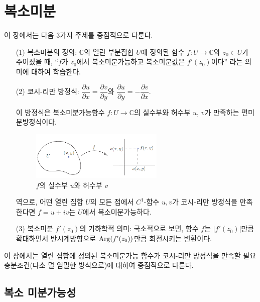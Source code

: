 
\chapter{복소미분}

이 장에서는 다음 3가지 주제를 중점적으로 다룬다.

\begin{itemize}
\item[(1)] 복소미분의 정의:
$\mathbb C$의 열린 부분집합 $U$에 정의된 함수 $f:U\to\mathbb C$와
$z_0\in U$가 주어졌을 때, ``$f$가 $z_0$에서 복소미분가능하고 복소미분값은 $f'(z_0)$이다''
라는 의미에 대하여 학습한다.
\item[(2)] 코시-리만 방정식: 
$\dfrac{\partial u}{\partial x} = \dfrac{\partial v}{\partial y}$와
$\dfrac{\partial u}{\partial y} = - \dfrac{\partial v}{\partial x}$.

이 방정식은 
복소미분가능함수 $f:U\to\mathbb C$의 실수부와 허수부 $u$, $v$가
만족하는 편미분방정식이다.

\begin{figure}[!h]
\begin{center}
\includegraphics[width=0.6\textwidth]{./SaltChapter/figs/fig-2-1}
\end{center}
\caption{$f$의 실수부 $u$와 허수부 $v$}
\label{fig-2-1}
\end{figure}

역으로, 어떤 열린 집합 $U$의 모든 점에서 $C^1$-함수 $u, v$가 
코시-리만 방정식을 만족한다면 $f=u+iv$는 $U$에서 복소미분가능하다.

\item[(3)] 복소미분 $f'(z_0)$의 기하학적 의미:
국소적으로 보면, 함수 $f$는 $|f'(z_0)|$만큼 확대하면서
반시계방향으로 $\mathop{\mathrm{Arg}}(f'(z_0))$만큼 회전시키는 변환이다.
\end{itemize}

이 장에서는
열린 집합에 정의된 복소미분가능 함수가 
코시-리만 방정식을 만족할 필요충분조건(다소 덜 엄밀한 방식으로)에 대하여
중점적으로 다룬다.

\section{복소 미분가능성}

